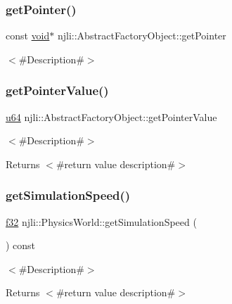 \subsubsection{\texorpdfstring{get\+Pointer()}{getPointer()}}
{\footnotesize\ttfamily const \mbox{\hyperlink{_thread_8h_af1e856da2e658414cb2456cb6f7ebc66}{void}}$\ast$ njli\+::\+Abstract\+Factory\+Object\+::get\+Pointer}

$<$\#\+Description\#$>$ \mbox{\label{classnjli_1_1_physics_world_a4ffddf141a426a5a07d0ac19f1913811}} 
\subsubsection{\texorpdfstring{get\+Pointer\+Value()}{getPointerValue()}}
{\footnotesize\ttfamily \mbox{\hyperlink{_util_8h_ad758b7a5c3f18ed79d2fcd23d9f16357}{u64}} njli\+::\+Abstract\+Factory\+Object\+::get\+Pointer\+Value}

$<$\#\+Description\#$>$

\begin{DoxyReturn}{Returns}
$<$\#return value description\#$>$ 
\end{DoxyReturn}
\mbox{\label{classnjli_1_1_physics_world_a9ea8ef8cac36b815fa7431bd7fbdd045}} 
\subsubsection{\texorpdfstring{get\+Simulation\+Speed()}{getSimulationSpeed()}}
{\footnotesize\ttfamily \mbox{\hyperlink{_util_8h_a5f6906312a689f27d70e9d086649d3fd}{f32}} njli\+::\+Physics\+World\+::get\+Simulation\+Speed (\begin{DoxyParamCaption}{ }\end{DoxyParamCaption}) const}

$<$\#\+Description\#$>$

\begin{DoxyReturn}{Returns}
$<$\#return value description\#$>$ 
\end{DoxyReturn}
\mbox{\label{classnjli_1_1_physics_world_ae347ecd60cf40a997e712bf0ff51f3f8}} 
